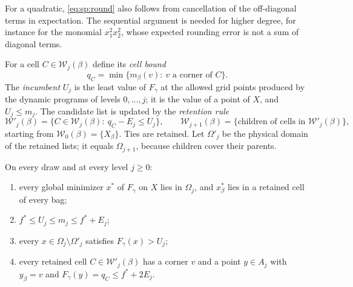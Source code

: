 For a quadratic, \eqref{eq:sp:round} also follows from cancellation of the
off-diagonal terms in expectation. The sequential argument is needed for
higher degree, for instance for the monomial $x_1^2x_2^2$, whose expected
rounding error is not a sum of diagonal terms.

For a cell $C\in\mathcal W_j(\beta)$ define its \emph{cell bound}
\[
 q_C=\min\{m_\beta(v):\ v\text{ a corner of }C\}.
\]
The \emph{incumbent} $U_j$ is the least value of $F_\gamma$ at the allowed
grid points produced by the dynamic programs of levels $0,\dots,j$; it is the
value of a point of $X$, and $U_j\le m_j$. The candidate list is updated by
the \emph{retention rule}
\begin{equation}\label{eq:sp:retain}
 \mathcal W'_j(\beta)=\{C\in\mathcal W_j(\beta):\ q_C-E_j\le U_j\},\qquad
 \mathcal W_{j+1}(\beta)=\{\text{children of cells in }\mathcal W'_j(\beta)\},
\end{equation}
starting from $\mathcal W_0(\beta)=\{X_\beta\}$. Ties are retained. Let
$\Omega'_j$ be the physical domain of the retained lists; it equals
$\Omega_{j+1}$, because children cover their parents.

\begin{proposition}\label{prop:sp:prune}
On every draw and at every level $j\ge0$:
\begin{enumerate}[label=(\alph*)]
\item every global minimizer $x^*$ of $F_\gamma$ on $X$ lies in $\Omega_j$,
and $x^*_\beta$ lies in a retained cell of every bag;
\item $f^*\le U_j\le m_j\le f^*+E_j$;
\item every $x\in\Omega_j\setminus\Omega'_j$ satisfies $F_\gamma(x)>U_j$;
\item every retained cell $C\in\mathcal W'_j(\beta)$ has a corner $v$ and a
point $y\in A_j$ with $y_\beta=v$ and $F_\gamma(y)=q_C\le f^*+2E_j$.
\end{enumerate}
\end{proposition}

